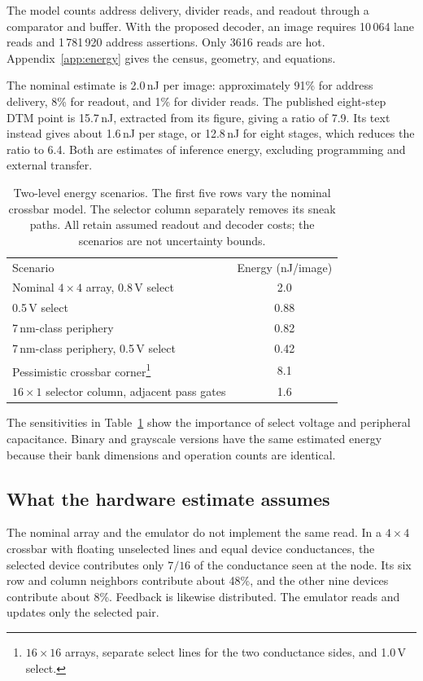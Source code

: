 \documentclass[reprint,amsmath,amssymb,aps,pra,floatfix,nofootinbib]{revtex4-2}
\begin{document}
The model counts address delivery, divider reads, and readout through a comparator and buffer. With the proposed decoder, an image requires 10\,064 lane reads and 1\,781\,920 address assertions. Only 3616 reads are hot. Appendix~\ref{app:energy} gives the census, geometry, and equations.

The nominal estimate is 2.0\,nJ per image: approximately 91\% for address delivery, 8\% for readout, and 1\% for divider reads. The published eight-step DTM point is 15.7\,nJ, extracted from its figure, giving a ratio of 7.9. Its text instead gives about 1.6\,nJ per stage, or 12.8\,nJ for eight stages, which reduces the ratio to 6.4. Both are estimates of inference energy, excluding programming and external transfer.

\begin{table}[tbp]
\caption{Two-level energy scenarios. The first five rows vary the nominal crossbar model. The selector column separately removes its sneak paths. All retain assumed readout and decoder costs; the scenarios are not uncertainty bounds.}
\label{tab:energy}
\begin{ruledtabular}
\footnotesize
\begin{tabular}{lc}
Scenario & Energy (nJ/image)\\
\colrule
Nominal $4\times4$ array, 0.8\,V select & 2.0\\
0.5\,V select & 0.88\\
7\,nm-class periphery & 0.82\\
7\,nm-class periphery, 0.5\,V select & 0.42\\
Pessimistic crossbar corner\footnote{$16\times16$ arrays, separate select lines for the two conductance sides, and 1.0\,V select.} & 8.1\\
\colrule
$16\times1$ selector column, adjacent pass gates & 1.6\\
\end{tabular}
\end{ruledtabular}
\end{table}

The sensitivities in Table~\ref{tab:energy} show the importance of select voltage and peripheral capacitance. Binary and grayscale versions have the same estimated energy because their bank dimensions and operation counts are identical.

\subsection{What the hardware estimate assumes}
The nominal array and the emulator do not implement the same read. In a $4\times4$ crossbar with floating unselected lines and equal device conductances, the selected device contributes only $7/16$ of the conductance seen at the node. Its six row and column neighbors contribute about 48\%, and the other nine devices contribute about 8\%. Feedback is likewise distributed. The emulator reads and updates only the selected pair.
\end{document}
